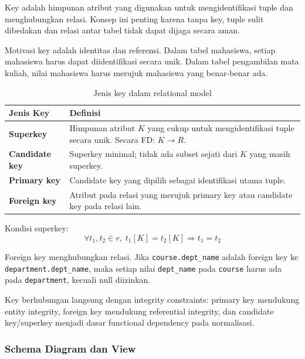 \begin{jawab}
Key adalah himpunan atribut yang digunakan untuk mengidentifikasi tuple dan menghubungkan relasi. Konsep ini penting karena tanpa key, tuple sulit dibedakan dan relasi antar tabel tidak dapat dijaga secara aman.
\end{jawab}

Motivasi key adalah identitas dan referensi. Dalam tabel mahasiswa, setiap mahasiswa harus dapat diidentifikasi secara unik. Dalam tabel pengambilan mata kuliah, nilai mahasiswa harus merujuk mahasiswa yang benar-benar ada.

\begin{table}[H]
\centering
\begin{tabularx}{\textwidth}{|L{0.24\textwidth}|X|}
\hline
\textbf{Jenis Key} & \textbf{Definisi} \\
\hline
\textbf{Superkey} & Himpunan atribut \(K\) yang cukup untuk mengidentifikasi tuple secara unik. Secara FD: \(K \rightarrow R\). \\
\hline
\textbf{Candidate key} & Superkey minimal; tidak ada subset sejati dari \(K\) yang masih superkey. \\
\hline
\textbf{Primary key} & Candidate key yang dipilih sebagai identifikasi utama tuple. \\
\hline
\textbf{Foreign key} & Atribut pada relasi yang merujuk primary key atau candidate key pada relasi lain. \\
\hline
\end{tabularx}
\caption{Jenis key dalam relational model}
\label{tab:key-types-relmodel}
\end{table}

Kondisi superkey:
\begin{equation}
    \forall t_1,t_2 \in r,\; t_1[K]=t_2[K] \Rightarrow t_1=t_2
    \label{eq:superkey-condition}
\end{equation}

Foreign key menghubungkan relasi. Jika \texttt{course.dept\_name} adalah foreign key ke \texttt{department.dept\_name}, maka setiap nilai \texttt{dept\_name} pada \texttt{course} harus ada pada \texttt{department}, kecuali null diizinkan.

Key berhubungan langsung dengan integrity constraints: primary key mendukung entity integrity, foreign key mendukung referential integrity, dan candidate key/superkey menjadi dasar functional dependency pada normalisasi.

\subsubsection{Schema Diagram dan View}

